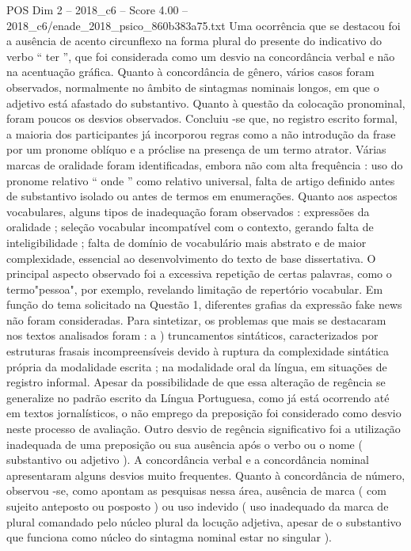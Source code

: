 \begin{textsample}{POS Dim 2 – 2018\_c6 – Score 4.00 – 2018\_c6/enade\_2018\_psico\_860b383a75.txt}
Uma ocorrência que se destacou foi a ausência de acento circunflexo na forma plural do presente do indicativo do verbo “ ter ”, que foi considerada como um desvio na concordância verbal e não na acentuação gráfica.
Quanto à concordância de gênero, vários casos foram observados, normalmente no âmbito de sintagmas nominais longos, em que o adjetivo está afastado do substantivo.
Quanto à questão da colocação pronominal, foram poucos os desvios observados.
Concluiu -se que, no registro escrito formal, a maioria dos participantes já incorporou regras como a não introdução da frase por um pronome oblíquo e a próclise na presença de um termo atrator.
Várias marcas de oralidade foram identificadas, embora não com alta frequência : uso do pronome relativo “ onde ” como relativo universal, falta de artigo definido antes de substantivo isolado ou antes de termos em enumerações.
Quanto aos aspectos vocabulares, alguns tipos de inadequação foram observados : expressões da oralidade ; seleção vocabular incompatível com o contexto, gerando falta de inteligibilidade ; falta de domínio de vocabulário mais abstrato e de maior complexidade, essencial ao desenvolvimento do texto de base dissertativa.
O principal aspecto observado foi a excessiva repetição de certas palavras, como o termo"pessoa", por exemplo, revelando limitação de repertório vocabular.
Em função do tema solicitado na Questão 1, diferentes grafias da expressão fake news não foram consideradas.
Para sintetizar, os problemas que mais se destacaram nos textos analisados foram : a ) truncamentos sintáticos, caracterizados por estruturas frasais incompreensíveis devido à ruptura da complexidade sintática própria da modalidade escrita ; na modalidade oral da língua, em situações de registro informal.
Apesar da possibilidade de que essa alteração de regência se generalize no padrão escrito da Língua Portuguesa, como já está ocorrendo até em textos jornalísticos, o não emprego da preposição foi considerado como desvio neste processo de avaliação.
Outro desvio de regência significativo foi a utilização inadequada de uma preposição ou sua ausência após o verbo ou o nome ( substantivo ou adjetivo ).
A concordância verbal e a concordância nominal apresentaram alguns desvios muito frequentes.
Quanto à concordância de número, observou -se, como apontam as pesquisas nessa área, ausência de marca ( com sujeito anteposto ou posposto ) ou uso indevido ( uso inadequado da marca de plural comandado pelo núcleo plural da locução adjetiva, apesar de o substantivo que funciona como núcleo do sintagma nominal estar no singular ).

\end{textsample}
